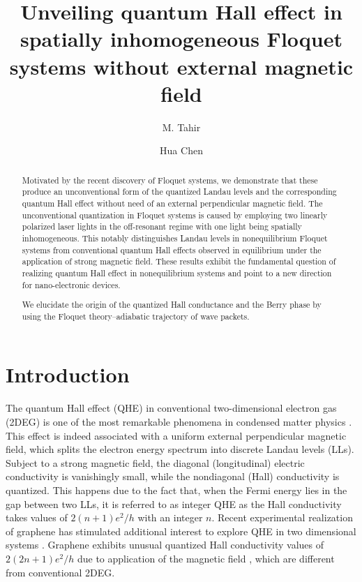 \documentclass[aps,prl,showpacs,twocolumn,amsmath,amssymb,superscriptaddress]{revtex4-2}
\begin{document}
\title{Unveiling quantum Hall effect in spatially inhomogeneous Floquet systems without external magnetic field}
\author{M. Tahir}
\author{Hua Chen}

\begin{abstract}
Motivated by the recent discovery of Floquet systems, we demonstrate that these produce an unconventional form of the quantized
Landau levels and the corresponding quantum Hall effect without need of an external perpendicular magnetic field. The unconventional quantization in Floquet systems is caused by employing two linearly polarized laser lights in the off-resonant regime with one light being spatially inhomogeneous. This notably distinguishes Landau levels in nonequilibrium Floquet systems from conventional quantum Hall effects observed in equilibrium under the application of strong magnetic field. These results exhibit the fundamental question of realizing quantum Hall effect in nonequilibrium systems and point to a new direction for nano-electronic devices.

We elucidate the origin of the quantized Hall conductance and the Berry phase by using the Floquet theory--adiabatic trajectory of wave packets.
\end{abstract}

\maketitle

\section{Introduction}

The quantum Hall effect (QHE) in conventional two-dimensional electron gas (2DEG) is one of the most remarkable phenomena in condensed matter physics \cite{QHE1}. This effect is indeed associated with a uniform external perpendicular magnetic field, which splits the electron energy spectrum into discrete Landau levels (LLs). Subject to a strong magnetic field, the diagonal (longitudinal) electric conductivity is vanishingly small, while the nondiagonal (Hall) conductivity is quantized. This happens due to the fact that, when the Fermi energy lies in the gap between two LLs, it is referred to as integer QHE as the Hall conductivity takes values of $2(n + 1)e^2/h$ with an integer $n$. Recent experimental realization of graphene has stimulated additional interest to explore QHE in two dimensional systems \cite{QHE2, QHE3, QHE4}. Graphene exhibits unusual quantized Hall conductivity values of $2(2n + 1)e^2/h$ due to application of the magnetic field \cite{QHE4}, which are different from conventional 2DEG.
\end{document}
